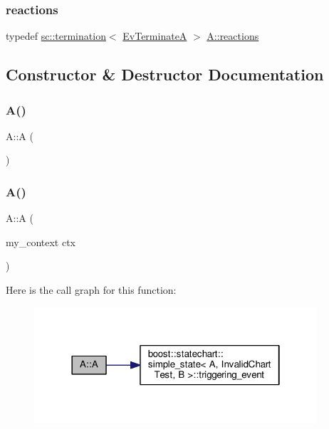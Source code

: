 \subsubsection{\texorpdfstring{reactions}{reactions}\hspace{0.1cm}{\footnotesize\ttfamily [13/13]}}
{\footnotesize\ttfamily typedef \mbox{\hyperlink{classboost_1_1statechart_1_1termination}{sc\+::termination}}$<$ \mbox{\hyperlink{struct_ev_terminate_a}{Ev\+TerminateA}} $>$ \mbox{\hyperlink{struct_a_aaf7ef039e669b21e19f81777afeed659}{A\+::reactions}}}



\subsection{Constructor \& Destructor Documentation}
\mbox{\label{struct_a_a4142862ec27f2f3d8deb026d51a5c5a0}} 
\subsubsection{\texorpdfstring{A()}{A()}\hspace{0.1cm}{\footnotesize\ttfamily [1/2]}}
{\footnotesize\ttfamily A\+::A (\begin{DoxyParamCaption}{ }\end{DoxyParamCaption})\hspace{0.3cm}{\ttfamily [inline]}}

\mbox{\label{struct_a_aa7bea9bf6fe35fcde90da1f5a06ba4e9}} 
\subsubsection{\texorpdfstring{A()}{A()}\hspace{0.1cm}{\footnotesize\ttfamily [2/2]}}
{\footnotesize\ttfamily A\+::A (\begin{DoxyParamCaption}\item[{my\+\_\+context}]{ctx }\end{DoxyParamCaption})\hspace{0.3cm}{\ttfamily [inline]}}

Here is the call graph for this function\+:
\nopagebreak
\begin{figure}[H]
\begin{center}
\leavevmode
\includegraphics[width=298pt]{struct_a_aa7bea9bf6fe35fcde90da1f5a06ba4e9_cgraph}
\end{center}
\end{figure}
\mbox{\label{struct_a_a8d74412b1ff05d7493b4c546795bf405}} 

